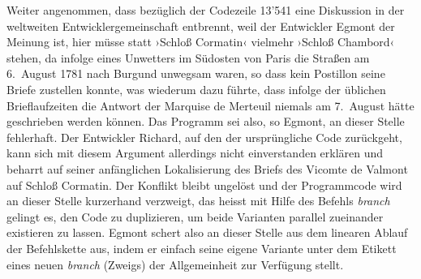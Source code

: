 \documentclass[a4paper,12pt]{article}
\newcommand{\inanf}[1]{›#1‹}
\begin{document}
\begin{comment}

Warum Gefährliche Liebschaften so gut geeignet ist: Relativ in der Zeit, so kommt aber kein Programm durch. Es muss _in_ der Zeit laufen...

Es ist eine Auswahl an Briefen, d.h. es können jederzeit irgendwo noch weitere zwischengeschoben werden... Ein dynamisches Unterfangen.

\end{comment}

Weiter angenommen, dass bezüglich der Codezeile 13'541 eine Diskussion in der weltweiten Entwicklergemeinschaft entbrennt, weil der Entwickler {\color{hokkaido}Egmont} der Meinung ist, hier müsse statt \inanf{Schloß Cormatin} vielmehr \inanf{Schloß Chambord} stehen, da infolge eines Unwetters im Südosten von Paris die Straßen am 6.~August 1781 nach Burgund unwegsam waren, so dass kein Postillon seine Briefe zustellen konnte, was wiederum dazu führte, dass infolge der üblichen Brieflaufzeiten die Antwort der Marquise de Merteuil niemals am 7.~August hätte geschrieben werden können. Das Programm sei also, so {\color{hokkaido}Egmont}, an dieser Stelle fehlerhaft. Der Entwickler {\color{dzug}Richard}, auf den der ursprüngliche Code zurückgeht, kann sich mit diesem Argument allerdings nicht einverstanden erklären und beharrt auf seiner anfänglichen Lokalisierung des Briefs des Vicomte de Valmont auf Schloß Cormatin. Der Konflikt bleibt ungelöst und der Programmcode wird an dieser Stelle kurzerhand verzweigt, das heisst mit Hilfe des Befehls \emph{branch} gelingt es, den Code zu duplizieren, um beide Varianten parallel zueinander existieren zu lassen. {\color{hokkaido}Egmont} schert also an dieser Stelle aus dem linearen Ablauf der Befehlskette aus, indem er einfach seine eigene Variante unter dem Etikett eines neuen \emph{branch} (Zweigs) der Allgemeinheit zur Verfügung stellt.
\end{document}
